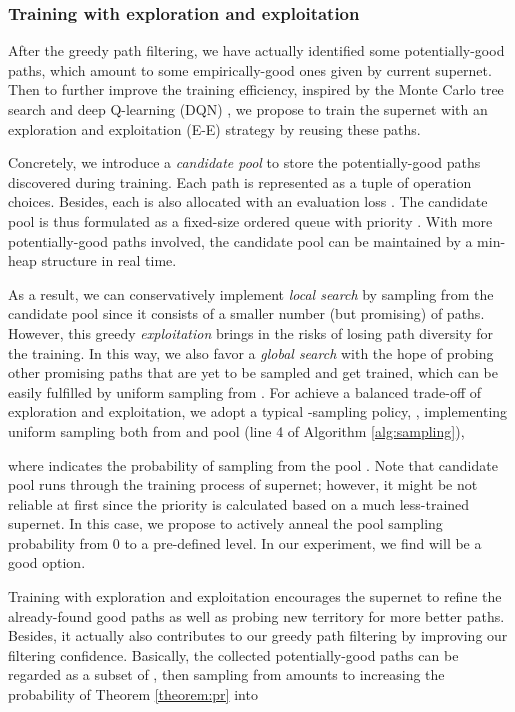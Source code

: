 \documentclass[10pt,twocolumn,letterpaper]{article}
\begin{document}
\subsubsection{Training with exploration and exploitation}
After the greedy path filtering, we have actually identified some potentially-good paths, which amount to some empirically-good ones given by current supernet. Then to further improve the training efficiency, inspired by the Monte Carlo tree search \cite{kocsis2006bandit} and deep Q-learning (DQN) \cite{mnih2013playing}, we propose to train the supernet with an exploration and exploitation (E-E) strategy by reusing these paths. 


Concretely,  we introduce a \textit{candidate pool}  to store the potentially-good paths discovered during training. Each path  is represented as a tuple of operation choices. Besides, each  is also allocated with an evaluation loss . The candidate pool is thus formulated as a fixed-size ordered queue with priority . With more potentially-good paths involved, the candidate pool can be maintained by a min-heap structure in real time. 

As a result, we can conservatively implement \textit{local search} by sampling from the candidate pool since it consists of a smaller number (but promising) of paths. However, this greedy \textit{exploitation} brings in the risks of losing path diversity for the training. In this way, we also favor a \textit{global search} with the hope of probing other promising paths that are yet to be sampled and get trained, which can be easily fulfilled by uniform sampling from . For achieve a balanced trade-off of exploration and exploitation, we adopt a typical -sampling policy, \ie, implementing uniform sampling both from  and pool  (line 4 of Algorithm \ref{alg:sampling}), 

where  indicates the probability of sampling from the pool . Note that candidate pool runs through the training process of supernet; however, it might be not reliable at first since the priority  is calculated based on a much less-trained supernet. In this case, we propose to actively anneal the pool sampling probability  from 0 to a pre-defined level. In our experiment, we find  will be a good option. 

Training with exploration and exploitation encourages the supernet to refine the already-found good paths as well as probing new territory for more better paths. Besides, it actually also contributes to our greedy path filtering by improving our filtering confidence. Basically, the collected potentially-good paths can be regarded as a subset of , then sampling from  amounts to increasing the probability  of Theorem \ref{theorem:pr} into 
\end{document}
